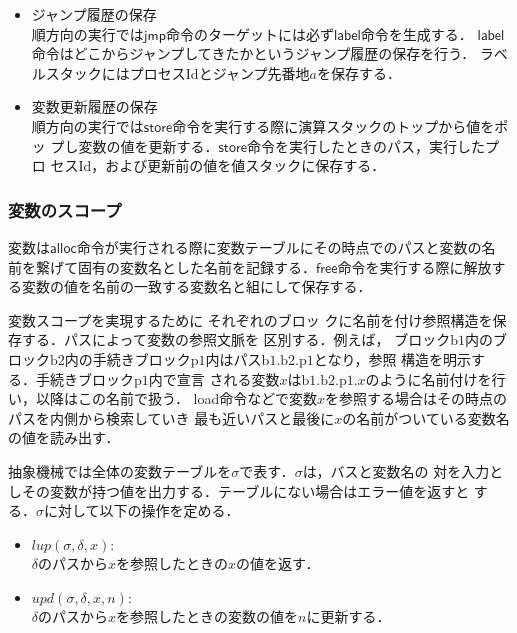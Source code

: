 \documentclass[submit,PRO]{ipsj}
\newcommand{\bcode}[1]{$\mathsf{#1}$}
\newcommand{\blabel}[1]{\mathrm{b}#1}
\newcommand{\plabel}[1]{\mathrm{p}#1}
\begin{document}
\begin{itemize}
 \item ジャンプ履歴の保存\\
順方向の実行では\bcode{jmp}命令のターゲットには必ず\bcode{label}命令を生成する．
\bcode{label}命令はどこからジャンプしてきたかというジャンプ履歴の保存を行う．
ラベルスタックにはプロセスIdとジャンプ先番地$a$を保存する．
\item 変数更新履歴の保存\\
順方向の実行では\bcode{store}命令を実行する際に演算スタックのトップから値をポッ
プし変数の値を更新する．\bcode{store}命令を実行したときのパス，実行したプロ
セスId，および更新前の値を値スタックに保存する．
\end{itemize}

\subsubsection{変数のスコープ}

変数は\bcode{alloc}命令が実行される際に変数テーブルにその時点でのパスと変数の名
前を繋げて固有の変数名とした名前を記録する．\bcode{free}命令を実行する際に解放す
る変数の値を名前の一致する変数名と組にして保存する．

変数スコープを実現するために
それぞれのブロッ
クに名前を付け参照構造を保存する．パスによって変数の参照文脈を
区別する．例えば，
ブロック$\blabel{1}$内のブロック$\blabel{2}$内の手続きブロック$\plabel{1}$内はパス$\blabel{1}.\blabel{2}.\plabel{1}$となり，参照
構造を明示する．手続きブロック$\plabel{1}$内で宣言
される変数$x$は$\blabel{1}.\blabel{2}.\plabel{1}.x$のように名前付けを行い，以降はこの名前で扱う．
load命令などで変数$x$を参照する場合はその時点のパスを内側から検索していき
最も近いパスと最後に$x$の名前がついている変数名の値を読み出す．

抽象機械では全体の変数テーブルを$\sigma$で表す．$\sigma$は，バスと変数名の
対を入力としその変数が持つ値を出力する．テーブルにない場合はエラー値を返すと
する．$\sigma$に対して以下の操作を定める．
\begin{itemize}
 \item $lup(\sigma,\delta,x)$:\\
$\delta$のパスから$x$を参照したときの$x$の値を返す．


 \item $upd(\sigma,\delta,x,n)$:\\
$\delta$のパスから$x$を参照したときの変数の値を$n$に更新する．
\end{itemize}
\end{document}
